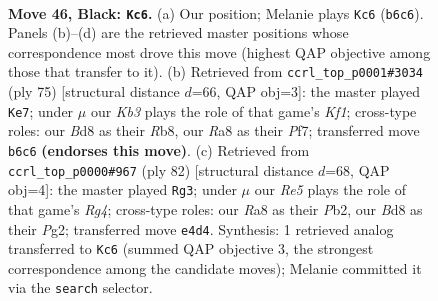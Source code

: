 \documentclass[11pt]{article}
\begin{document}
\clearpage

\begin{figure}[p]\centering
\begin{subfigure}{0.46\textwidth}\centering
\resizebox{\linewidth}{!}{%
\newchessgame
\chessboard[
  setfen={r2b4/1p5p/nk4pP/p4p2/P2BrN2/3R2P1/8/R6K b - - 0 46},
  showmover=false,
  pgfstyle=straightmove, color=movearrow, markmove={b6-c6}
]}
\caption{}
\end{subfigure}\hfill
\begin{subfigure}{0.46\textwidth}\centering
\resizebox{\linewidth}{!}{%
\newchessgame
\chessboard[
  setfen={1r3k2/5p1p/2p3pP/3p1b2/N4P2/1r3B2/6P1/R1K2R2 b - - 3 38},
  showmover=false,
  pgfstyle=straightmove, color=movearrow, markmove={f8-e7}
]}
\caption{}
\end{subfigure}
\\[4pt]
\begin{subfigure}{0.46\textwidth}\centering
\resizebox{\linewidth}{!}{%
\newchessgame
\chessboard[
  setfen={2r1r3/7p/p1k3bP/P2NB3/3KP1R1/1p6/1P4P1/8 w - - 1 42},
  showmover=false,
  pgfstyle=straightmove, color=movearrow, markmove={g4-g3}
]}
\caption{}
\end{subfigure}\hfill

\caption{\textbf{Move 46, Black: \texttt{Kc6}.} (a) Our position; Melanie plays \texttt{Kc6} (\texttt{b6c6}). Panels (b)--(d) are the retrieved master positions whose correspondence most drove this move (highest QAP objective among those that transfer to it). (b) Retrieved from \texttt{ccrl\_top\_p0001\#3034} (ply 75) [structural distance $d$=66, QAP obj=3]: the master played \texttt{Ke7}; under $\mu$ our \emph{Kb3} plays the role of that game's \emph{Kf1}; cross-type roles: our \emph{B}d8 as their \emph{R}b8, our \emph{R}a8 as their \emph{P}f7; transferred move \texttt{b6c6} \textbf{(endorses this move)}. (c) Retrieved from \texttt{ccrl\_top\_p0000\#967} (ply 82) [structural distance $d$=68, QAP obj=4]: the master played \texttt{Rg3}; under $\mu$ our \emph{Re5} plays the role of that game's \emph{Rg4}; cross-type roles: our \emph{R}a8 as their \emph{P}b2, our \emph{B}d8 as their \emph{P}g2; transferred move \texttt{e4d4}. Synthesis: 1 retrieved analog transferred to \texttt{Kc6} (summed QAP objective 3, the strongest correspondence among the candidate moves); Melanie committed it via the \texttt{search} selector.}
\label{fig:thought-m91}
\end{figure}

\clearpage
\end{document}

